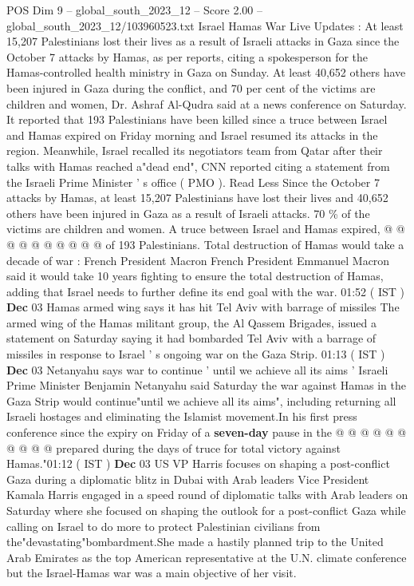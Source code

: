 \begin{textsample}{POS Dim 9 – global\_south\_2023\_12 – Score 2.00 – global\_south\_2023\_12/103960523.txt}  \label{ex:f9_pos_015}
Israel Hamas War Live Updates : At least 15,207 Palestinians lost their lives as a result of Israeli attacks in Gaza since the October 7 attacks by Hamas, as per reports, citing a spokesperson for the Hamas-controlled health ministry in Gaza on Sunday.
At least 40,652 others have been injured in Gaza during the conflict, and 70 per cent of the victims are children and women, Dr.
Ashraf Al-Qudra said at a news conference on Saturday.
It reported that 193 Palestinians have been killed since a truce between Israel and Hamas expired on Friday morning and Israel resumed its attacks in the region.
Meanwhile, Israel recalled its negotiators team from Qatar after their talks with Hamas reached a"dead end", CNN reported citing a statement from the Israeli Prime Minister ' s office ( PMO ).
Read Less Since the October 7 attacks by Hamas, at least 15,207 Palestinians have lost their lives and 40,652 others have been injured in Gaza as a result of Israeli attacks. 70 \% of the victims are children and women.
A truce between Israel and Hamas expired, @ @ @ @ @ @ @ @ @ @ of 193 Palestinians.
Total destruction of Hamas would take a decade of war : French President Macron French President Emmanuel Macron said it would take 10 years fighting to ensure the total destruction of Hamas, adding that Israel needs to further define its end goal with the war. 01:52 ( IST ) \textbf{Dec} 03 Hamas armed wing says it has hit Tel Aviv with barrage of missiles The armed wing of the Hamas militant group, the Al Qassem Brigades, issued a statement on Saturday saying it had bombarded Tel Aviv with a barrage of missiles in response to Israel ' s ongoing war on the Gaza Strip. 01:13 ( IST ) \textbf{Dec} 03 Netanyahu says war to continue ' until we achieve all its aims ' Israeli Prime Minister Benjamin Netanyahu said Saturday the war against Hamas in the Gaza Strip would continue"until we achieve all its aims", including returning all Israeli hostages and eliminating the Islamist movement.In his first press conference since the expiry on Friday of a \textbf{seven-day} pause in the @ @ @ @ @ @ @ @ @ @ prepared during the days of truce for total victory against Hamas."01:12 ( IST ) \textbf{Dec} 03 US VP Harris focuses on shaping a post-conflict Gaza during a diplomatic blitz in Dubai with Arab leaders Vice President Kamala Harris engaged in a speed round of diplomatic talks with Arab leaders on Saturday where she focused on shaping the outlook for a post-conflict Gaza while calling on Israel to do more to protect Palestinian civilians from the"devastating"bombardment.She made a hastily planned trip to the United Arab Emirates as the top American representative at the U.N. climate conference but the Israel-Hamas war was a main objective of her visit.

\end{textsample}
